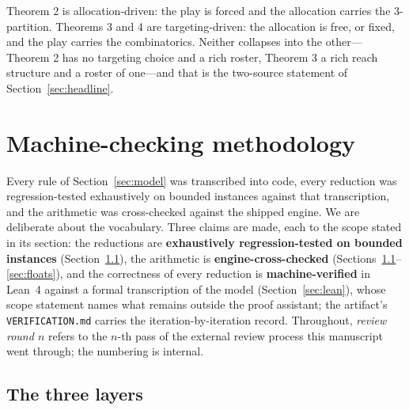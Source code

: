 \documentclass[11pt,a4paper]{article}
\theoremstyle{plain}
\theoremstyle{definition}
\theoremstyle{plain}
\theoremstyle{definition}
\theoremstyle{remark}
\newcommand{\src}[1]{\texttt{#1}}
\begin{document}
Theorem 2 is allocation-driven: the play is forced and the allocation carries the 3-partition.
Theorems 3 and 4 are targeting-driven: the allocation is free, or fixed, and the play carries
the combinatorics. Neither collapses into the other---Theorem 2 has no targeting
choice and a rich roster, Theorem 3 a rich reach structure and a roster of one---and that is
the two-source statement of Section~\ref{sec:headline}.

\section{Machine-checking methodology}\label{sec:checking}

Every rule of Section~\ref{sec:model} was transcribed into code, every reduction was
regression-tested exhaustively on bounded instances against that transcription, and the
arithmetic was cross-checked against the shipped engine. We are deliberate about the
vocabulary. Three claims are made, each to the scope stated in its section: the reductions
are \textbf{exhaustively regression-tested on bounded instances} (Section~\ref{sec:layers}),
the arithmetic is \textbf{engine-cross-checked}
(Sections~\ref{sec:layers}--\ref{sec:floats}), and the correctness of every reduction is
\textbf{machine-verified} in Lean~4 against a formal transcription of the model
(Section~\ref{sec:lean}), whose scope statement names what remains outside the proof
assistant; the artifact's \src{VERIFICATION.md} carries the iteration-by-iteration record.
Throughout, \emph{review round $n$} refers to the $n$-th pass of the external review process
this manuscript went through; the numbering is internal.

\subsection{The three layers}\label{sec:layers}
\end{document}
